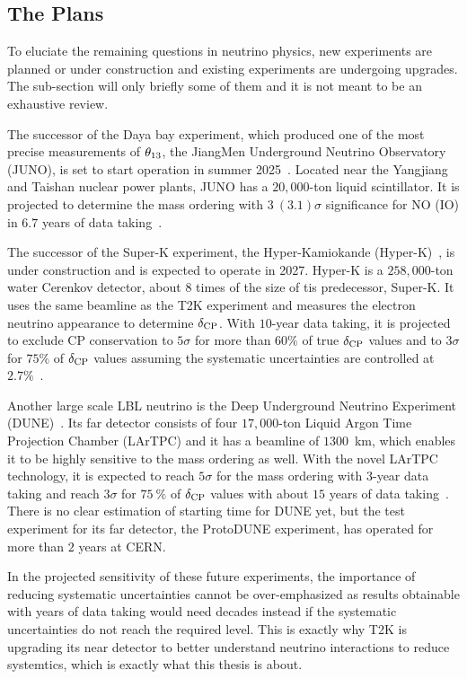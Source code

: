 \subsection{The Plans}
To eluciate the remaining questions in neutrino physics, new experiments are planned or under construction and existing experiments are undergoing upgrades.
The sub-section will only briefly some of them and it is not meant to be an exhaustive review.

The successor of the Daya bay experiment, which produced one of the most precise measurements of $\theta_{13}$, the JiangMen Underground Neutrino Observatory (JUNO), is set to start operation in summer 2025~\cite{ScienceNews2025}.
Located near the Yangjiang and Taishan nuclear power plants, JUNO has a $20,000$-ton liquid scintillator.
It is projected to determine the mass ordering with $3~(3.1)\sigma$ significance for NO (IO) in $6.7$ years of data taking~\cite{Paoloni:2024atc}.

The successor of the Super-K experiment, the Hyper-Kamiokande (Hyper-K)~\cite{Hyper-Kamiokande:2018ofw}, is under construction and is expected to operate in 2027.
Hyper-K is a $258,000$-ton water Cerenkov detector, about $8$ times of the size of tis predecessor, Super-K.
It uses the same beamline as the T2K experiment and measures the electron neutrino appearance to determine $\delta_\textrm{CP}$.
With $10$-year data taking, it is projected to exclude CP conservation to $5\sigma$ for more than $60\%$ of true $\delta_\textrm{CP}$ values and to $3\sigma$ for $75\%$ of $\delta_\textrm{CP}$ values assuming the systematic uncertainties are controlled at $2.7\%$~\cite{Jesus-Valls:2024ady}.

Another large scale LBL neutrino is the Deep Underground Neutrino Experiment (DUNE)~\cite{DUNE:2016hlj,DUNE:2015lol,DUNE:2016evb,DUNE:2016rla,DUNE:2021tad}.
Its far detector consists of four $17,000$-ton Liquid Argon Time Projection Chamber (LArTPC) and it has a beamline of $1300$~km, which enables it to be highly sensitive to the mass ordering as well.
With the novel LArTPC technology, it is expected to reach $5\sigma$ for the mass ordering with 3-year data taking and reach $3\sigma$ for $75~\%$ of $\delta_\textrm{CP}$ values with about $15$ years of data taking~\cite{Gil-Botella:2024duf}.
There is no clear estimation of starting time for DUNE yet, but the test experiment for its far detector, the ProtoDUNE experiment, has operated for more than $2$ years at CERN.

In the projected sensitivity of these future experiments, the importance of reducing systematic uncertainties cannot be over-emphasized as results obtainable with years of data taking would need decades instead if the systematic uncertainties do not reach the required level.
This is exactly why T2K is upgrading its near detector to better understand neutrino interactions to reduce systemtics, which is exactly what this thesis is about.

